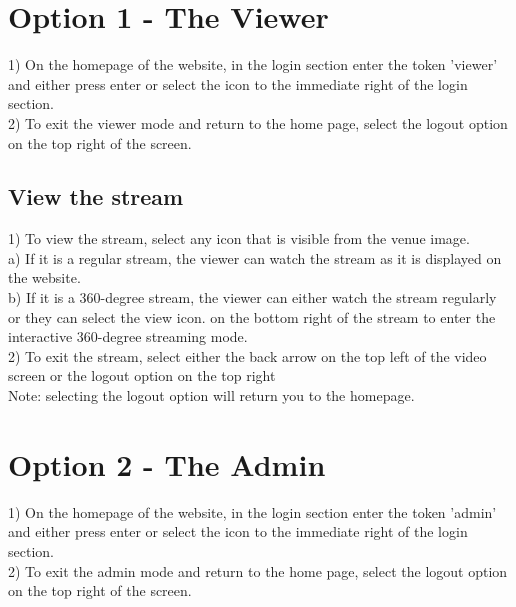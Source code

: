 \documentclass[onecolumn, draftclsnofoot,10pt, compsoc]{IEEEtran}
\begin{document}
    

\newpage
{}
\tableofcontents
\clearpage

\section{Option 1 - The Viewer}
1)  On the homepage of the website, in the login section enter the token 'viewer' and either press enter or select the icon to the immediate right of the login section. \\
2) To exit the viewer mode and return to the home page, select the logout option on the top right of the screen.

\subsection{View the stream}
1) To view the stream, select any icon that is visible from the venue image. \\
    \hspace*{1cm} a) If it is a regular stream, the viewer can watch the stream as it is displayed on the website. \\
    \hspace*{1cm} b) If it is a 360-degree stream, the viewer can either watch the stream regularly or they can select the view icon. 
    \hspace*{1cm} on the bottom right of the stream to enter the interactive 360-degree streaming mode. \\
2) To exit the stream, select either the back arrow on the top left of the video screen or the logout option on the top right \\ 
\hspace*{1cm} Note: selecting the logout option will return you to the homepage. 

\section{Option 2 - The Admin}
1) On the homepage of the website, in the login section enter the token 'admin' and either press enter or select the icon to the immediate right of the login section. \\
2) To exit the admin mode and return to the home page, select the logout option on the top right of the screen.
\end{document}

